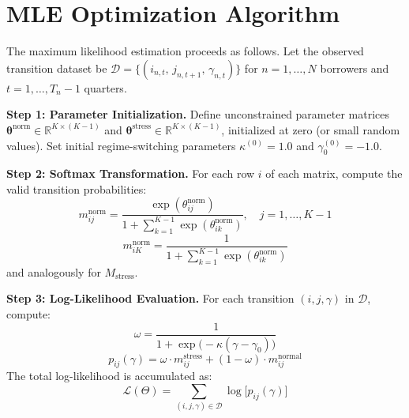 \documentclass[12pt,a4paper]{article}
\newcommand{\Mstress}{M_{\text{stress}}}
\begin{document}
\vspace{1cm}

\renewcommand{\thesection}{\Alph{section}}

\section{MLE Optimization Algorithm}
\label{app:mle}

The maximum likelihood estimation proceeds as follows. Let the observed transition dataset be $\mathcal{D} = \{(i_{n,t},\, j_{n,t+1},\, \gamma_{n,t})\}$ for $n = 1, \ldots, N$ borrowers and $t = 1, \ldots, T_n - 1$ quarters.

\textbf{Step 1: Parameter Initialization.} Define unconstrained parameter matrices $\boldsymbol{\theta}^{\text{norm}} \in \mathbb{R}^{K \times (K-1)}$ and $\boldsymbol{\theta}^{\text{stress}} \in \mathbb{R}^{K \times (K-1)}$, initialized at zero (or small random values). Set initial regime-switching parameters $\kappa^{(0)} = 1.0$ and $\gamma_0^{(0)} = -1.0$.

\textbf{Step 2: Softmax Transformation.} For each row $i$ of each matrix, compute the valid transition probabilities:
\begin{equation}
m_{ij}^{\text{norm}} = \frac{\exp(\theta_{ij}^{\text{norm}})}{1 + \sum_{k=1}^{K-1} \exp(\theta_{ik}^{\text{norm}})}, \quad j = 1, \ldots, K-1
\end{equation}
\begin{equation}
m_{iK}^{\text{norm}} = \frac{1}{1 + \sum_{k=1}^{K-1} \exp(\theta_{ik}^{\text{norm}})}
\end{equation}
and analogously for $\Mstress$.

\textbf{Step 3: Log-Likelihood Evaluation.} For each transition $(i, j, \gamma)$ in $\mathcal{D}$, compute:
\begin{equation}
\omega = \frac{1}{1 + \exp\bigl(-\kappa(\gamma - \gamma_0)\bigr)}
\end{equation}
\begin{equation}
p_{ij}(\gamma) = \omega \cdot m_{ij}^{\text{stress}} + (1 - \omega) \cdot m_{ij}^{\text{normal}}
\end{equation}
The total log-likelihood is accumulated as:
\begin{equation}
\mathcal{L}(\Theta) = \sum_{(i,j,\gamma) \in \mathcal{D}} \log\bigl[p_{ij}(\gamma)\bigr]
\end{equation}
\end{document}
